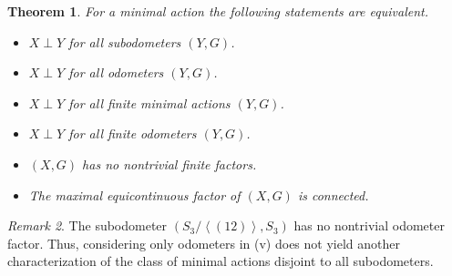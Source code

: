 \documentclass[12pt, reqno]{amsart}
\newtheorem{theorem}{Theorem}[section]
\theoremstyle{definition}
\theoremstyle{remark}
\newtheorem{remark}[theorem]{Remark}
\numberwithin{equation}{section}
\theoremstyle{theorem}
\theoremstyle{remark}
\newcommand{\grouphull}[1]{\left\langle #1 \right\rangle}
\begin{document}
\begin{theorem}
\label{the:characterizationDisjointnessToSubodometers}
    For a minimal action the following statements are equivalent. 
    \begin{itemize}
        \item[(i)] $X\perp Y$ for all subodometers $(Y,G)$. 
        \item[(ii)] $X\perp Y$ for all odometers $(Y,G)$.
        \item[(iii)] $X\perp Y$ for all finite minimal actions $(Y,G)$. 
        \item[(iv)] $X\perp Y$ for all finite odometers $(Y,G)$.
        \item[(v)] $(X,G)$ has no nontrivial finite factors. 
        \item[(vi)] The maximal equicontinuous factor of $(X,G)$ is connected. 
    \end{itemize}
\end{theorem}
\begin{remark}
    The subodometer $(S_3/\grouphull{(12)},S_3)$ has no nontrivial odometer factor. Thus, considering only odometers in (v) does not yield another characterization of the class of minimal actions disjoint to all subodometers. 
\end{remark}
\end{document}
